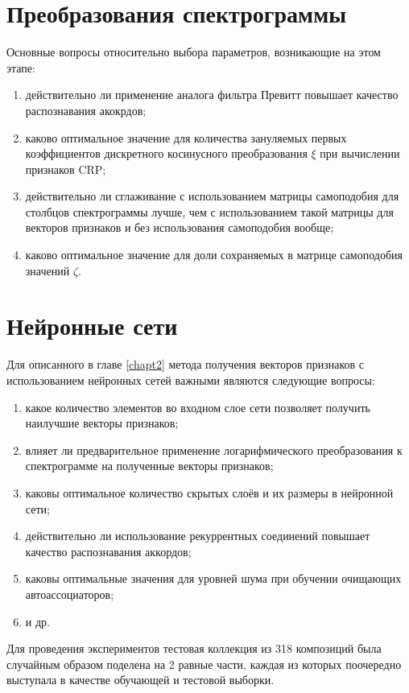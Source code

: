 \section{Преобразования спектрограммы} \label{sect3_specttrans}

Основные вопросы относительно выбора параметров, возникающие на этом этапе:
\begin{enumerate}
  \item действительно ли применение аналога фильтра Превитт повышает качество
  распознавания акокрдов;
  \item каково оптимальное значение для количества зануляемых первых
  коэффициентов дискретного косинусного преобразования $\xi$ при вычислении
  признаков CRP;
  \item действительно ли сглаживание с использованием матрицы самоподобия для
  столбцов спектрограммы лучше, чем с использованием такой матрицы для векторов
  признаков и без использования самоподобия вообще;
  \item каково оптимальное значение для доли сохраняемых в матрице самоподобия
  значений $\zeta$.
\end{enumerate}

\section{Нейронные сети} \label{sect3_nn}

Для описанного в главе \ref{chapt2} метода получения векторов признаков с
использованием нейронных сетей важными являются следующие вопросы:
\begin{enumerate}
  \item какое количество элементов во входном слое сети позволяет получить
  наилучшие векторы признаков;
  \item влияет ли предварительное применение логарифмического преобразования к
  спектрограмме на полученные векторы признаков;
  \item каковы оптимальное количество скрытых слоёв и их размеры в нейронной
  сети;
  \item действительно ли использование рекуррентных соединений повышает качество
  распознавания аккордов;
  \item каковы оптимальные значения для уровней шума при обучении очищающих
  автоассоциаторов;
  \item и др.
\end{enumerate}

Для проведения экспериментов тестовая коллекция из 318 композиций была случайным
образом поделена на 2 равные части, каждая из которых поочередно выступала в
качестве обучающей и тестовой выборки.

